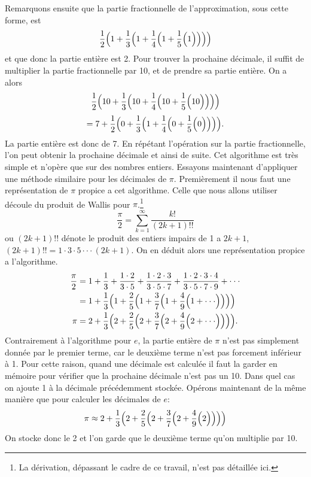 \documentclass{article}
\begin{document}
Remarquons ensuite que la partie fractionnelle de l'approximation, sous cette forme, est
$$
\frac{1}{2}\Bigl(1+\frac{1}{3}\Bigl(1+\frac{1}{4}\Bigl(1+\frac{1}{5}\Bigl(1\Bigr)\Bigr)\Bigr)\Bigr)
$$
et que donc la partie entière est 2.
Pour trouver la prochaine décimale, il suffit de multiplier la partie fractionnelle par 10, et de prendre sa partie entière. On a alors
$$
\frac{1}{2}\Bigl(10+\frac{1}{3}\Bigl(10+\frac{1}{4}\Bigl(10+\frac{1}{5}\Bigl(10\Bigr)\Bigr)\Bigr)\Bigr)
$$
$$
=7+\frac{1}{2}\Bigl(0+\frac{1}{3}\Bigl(1+\frac{1}{4}\Bigl(0+\frac{1}{5}\Bigl(0\Bigr)\Bigr)\Bigr)\Bigr).
$$
La partie entière est donc de 7. En répétant l'opération sur la partie fractionnelle, l'on peut obtenir la prochaine décimale et ainsi de suite. Cet algorithme est très simple et n'opère que sur des nombres entiers. Essayons maintenant d'appliquer une méthode similaire pour les décimales de $\pi$.
Premièrement il nous faut une représentation de $\pi$ propice a cet algorithme. Celle que nous allons utiliser découle du produit de Wallis pour $\pi$.\footnote{La dérivation, dépassant le cadre de ce travail, n'est pas détaillée ici.} 
$$
\frac{\pi}{2} = \sum_{k=1}^{\infty}\frac{k!}{(2k+1)!!}
$$
ou $(2k+1)!!$ dénote le produit des entiers impairs de 1 a $2k+1$, $(2k+1)!! = 1\cdot3\cdot5\cdot\cdot\cdot (2k+1)$. 
On en déduit alors une représentation propice a l'algorithme.
\begin{align*}
\frac{\pi}{2} &= 1 + \frac{1}{3} + \frac{1\cdot2}{3\cdot5} +  \frac{1\cdot2\cdot3}{3\cdot5\cdot7} + \frac{1\cdot2\cdot3\cdot4}{3\cdot5\cdot7\cdot9} + \cdot\cdot\cdot\\
 &= 1 + \frac{1}{3}\Bigl(1+\frac{2}{5}\Bigl(1+\frac{3}{7}\Bigl(1+\frac{4}{9}\Bigl(1+\cdot\cdot\cdot\Bigr)\Bigr)\Bigr)\Bigr)\\
 \pi &= 2 + \frac{1}{3}\Bigl(2+\frac{2}{5}\Bigl(2+\frac{3}{7}\Bigl(2+\frac{4}{9}\Bigl(2+\cdot\cdot\cdot\Bigr)\Bigr)\Bigr)\Bigr).
\end{align*}
Contrairement à l'algorithme pour $e$, la partie entière de $\pi$ n'est pas simplement donnée par le premier terme, car le deuxième terme n'est pas forcement inférieur à 1. Pour cette raison, quand une décimale est calculée il faut la garder en mémoire pour vérifier que la prochaine décimale n'est pas un 10. Dans quel cas on ajoute 1 à la décimale précédemment stockée. Opérons maintenant de la même manière que pour calculer les décimales de $e$:
$$
\pi \approx 2 + \frac{1}{3}\Bigl(2+\frac{2}{5}\Bigl(2+\frac{3}{7}\Bigl(2+\frac{4}{9}\Bigl(2\Bigr)\Bigr)\Bigr)\Bigr)
$$
On stocke donc le 2 et l'on garde que le deuxième terme qu'on multiplie par 10.
\end{document}
